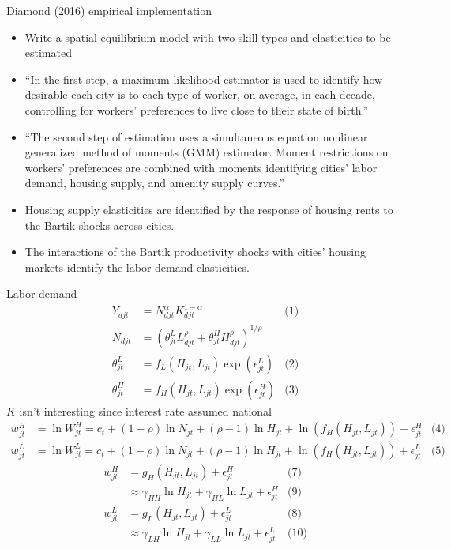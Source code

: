 \documentclass[10pt,notes=hide]{beamer}
\begin{document}
\begin{frame}{Diamond (2016) empirical implementation}
\begin{itemize}
	\item Write a spatial-equilibrium model with two skill types and elasticities to be estimated
	\item ``In the first step, a maximum likelihood estimator is used to identify how desirable each city is to each type of worker, on average, in each decade, controlling for workers' preferences to live close to their state of birth.''
	\item ``The second step of estimation uses a simultaneous equation nonlinear generalized method of moments (GMM) estimator. Moment restrictions on workers' preferences are combined with moments identifying cities' labor demand, housing supply, and amenity supply curves.''
	\item Housing supply elasticities are identified by the response of housing rents to the Bartik shocks across cities. 
	\item The interactions of the Bartik productivity shocks with cities' housing markets identify the labor demand elasticities.
\end{itemize}
\end{frame}
\begin{frame}{Labor demand}
\begin{align*}
Y_{djt} &= N^{\alpha}_{djt} K^{1-\alpha}_{djt}
&\text{(1)} \\
N_{djt} &= \left(\theta^{L}_{jt} L^{\rho}_{djt} + \theta^{H}_{jt} H^{\rho}_{djt}\right)^{1/{\rho}} \\
\theta^{L}_{jt} &= f_L \left(H_{jt}, L_{jt}\right) \exp(\epsilon_{jt}^{L})
&\text{(2)} \\
\theta^{H}_{jt} &= f_H \left(H_{jt}, L_{jt}\right) \exp(\epsilon_{jt}^{H})
&\text{(3)}
\end{align*}
$K$ isn't interesting since interest rate assumed national
\begin{align*}
w_{jt}^{H} &= \ln W_{jt}^{H} = c_{t} + (1-\rho) \ln N_{jt} + (\rho-1) \ln H_{jt} + \ln \left(f_H(H_{jt},L_{jt})\right) + \epsilon_{jt}^{H}
&\text{(4)} \\
w_{jt}^{L} &= \ln W_{jt}^{L} = c_{t} + (1-\rho) \ln N_{jt} + (\rho-1) \ln H_{jt} + \ln \left(f_H(H_{jt},L_{jt})\right) + \epsilon_{jt}^{L}
&\text{(5)} %
\end{align*}
\begin{align*}
w_{jt}^{H} &= g_{H} \left(H_{jt},L_{jt}\right) + \epsilon_{jt}^{H}
&\text{(7)} \\
&\approx \gamma_{HH} \ln H_{jt} + \gamma_{HL} \ln L_{jt} + \epsilon_{jt}^{H}
&\text{(9)} \\
w_{jt}^{L} &= g_{L} \left(H_{jt},L_{jt}\right) + \epsilon_{jt}^{L}
&\text{(8)} \\
&\approx \gamma_{LH} \ln H_{jt} + \gamma_{LL} \ln L_{jt} + \epsilon_{jt}^{L}
&\text{(10)} %
\end{align*}
\end{frame}
\end{document}
